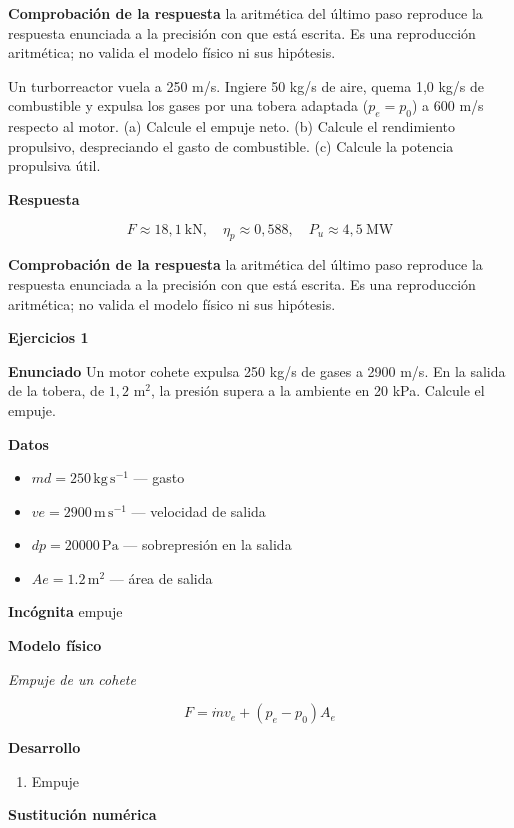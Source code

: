 \documentclass[10pt,openany]{book}
\begin{document}
\noindent\textbf{Comprobación de la respuesta} la aritmética del último paso reproduce la respuesta enunciada a la precisión con que está escrita. Es una reproducción aritmética; no valida el modelo físico ni sus hipótesis.

Un turborreactor vuela a 250 m/s. Ingiere 50 kg/s de aire, quema 1,0 kg/s de combustible y expulsa los gases por una tobera adaptada (\(p_e = p_0\)) a 600 m/s respecto al motor. (a) Calcule el empuje neto. (b) Calcule el rendimiento propulsivo, despreciando el gasto de combustible. (c) Calcule la potencia propulsiva útil.

\noindent\textbf{Respuesta}

\[
F \approx 18{,}1\ \mathrm{kN},\quad \eta_p \approx 0{,}588,\quad P_u \approx 4{,}5\ \mathrm{MW}
\]

\noindent\textbf{Comprobación de la respuesta} la aritmética del último paso reproduce la respuesta enunciada a la precisión con que está escrita. Es una reproducción aritmética; no valida el modelo físico ni sus hipótesis.

\noindent\textbf{Ejercicios 1}

\noindent\textbf{Enunciado}
Un motor cohete expulsa 250 kg/s de gases a 2900 m/s. En la salida de la tobera, de \(1{,}2\) m\(^2\), la presión supera a la ambiente en 20 kPa. Calcule el empuje.

\noindent\textbf{Datos}
\begin{itemize}
\item $md = 250\,\mathrm{kg}\,\mathrm{s}^{-1}$ — gasto
\item $ve = 2900\,\mathrm{m}\,\mathrm{s}^{-1}$ — velocidad de salida
\item $dp = 20000\,\mathrm{Pa}$ — sobrepresión en la salida
\item $Ae = 1.2\,\mathrm{m}^{2}$ — área de salida
\end{itemize}

\noindent\textbf{Incógnita}
empuje

\noindent\textbf{Modelo físico}

\noindent\textit{Empuje de un cohete}

\[
F = \dot m v_e + (p_e - p_0) A_e
\]

\noindent\textbf{Desarrollo}
\begin{enumerate}
\item
Empuje
\end{enumerate}

\noindent\textbf{Sustitución numérica}
\end{document}
